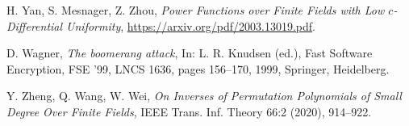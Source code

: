 \documentclass[11pt]{article}
\begin{document}
\begin{thebibliography}{99}

H. Yan, S. Mesnager, Z. Zhou,
{\em Power Functions over Finite Fields with Low $c$-Differential Uniformity}, \url{https://arxiv.org/pdf/2003.13019.pdf}.

 
D. Wagner, {\em The boomerang attack}, In: L. R. Knudsen (ed.), Fast Software Encryption, FSE '99, LNCS 1636, pages 156--170, 1999, Springer, Heidelberg.
 

Y. Zheng, Q. Wang, W.  Wei,
{\em On Inverses of Permutation Polynomials of Small Degree Over Finite Fields}, IEEE Trans. Inf. Theory 66:2 (2020),  914--922.

\end{thebibliography}
\end{document}
